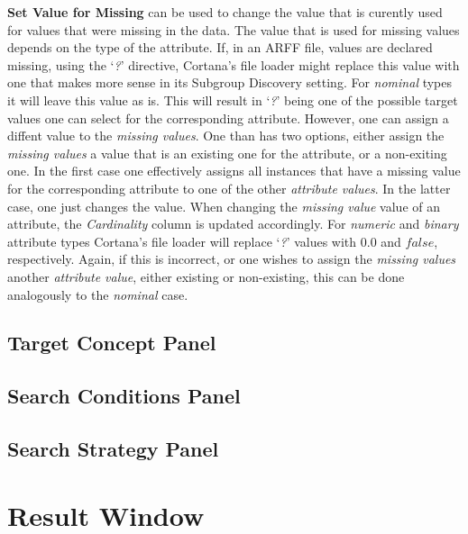 \documentclass{article}
\begin{document}
\textbf{Set Value for Missing} can be used to change the value that is curently used for values that were missing in the data.
The value that is used for missing values depends on the type of the attribute.
If, in an ARFF file, values are declared missing, using the `\emph{?}' directive, Cortana's file loader might replace this value with one that makes more sense in its Subgroup Discovery setting.
For \emph{nominal} types it will leave this value as is.
This will result in `\emph{?}' being one of the possible target values one can select for the corresponding attribute.
However, one can assign a diffent value to the \emph{missing values}.
One than has two options, either assign the \emph{missing values} a value that is an existing one for the attribute, or a non-exiting one.
In the first case one effectively assigns all instances that have a missing value for the corresponding attribute to one of the other \emph{attribute values}.
In the latter case, one just changes the value.
When changing the \emph{missing value} value of an attribute, the \emph{Cardinality} column is updated accordingly.
For \emph{numeric} and \emph{binary} attribute types Cortana's file loader will replace `\emph{?}' values with $0.0$ and $false$, respectively.
Again, if this is incorrect, or one wishes to assign the \emph{missing values} another \emph{attribute value}, either existing or non-existing, this can be done analogously to the \emph{nominal} case.

\subsection{Target Concept Panel}
\label{sec:targetconcept}

\subsection{Search Conditions Panel}
\label{sec:searchconditions}

\subsection{Search Strategy Panel}
\label{sec:searchstrategy}

\section{Result Window}

\appendix
\clearpage
~\vfill

\end{document}
